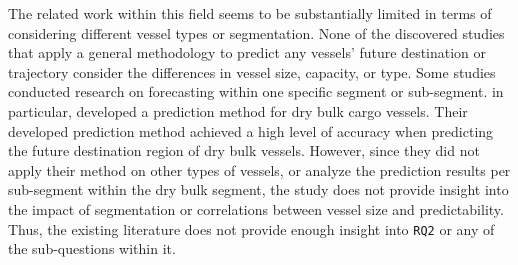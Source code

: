 The related work within this field seems to be substantially limited in terms of considering different vessel types or segmentation. None of the discovered studies that apply a general methodology to predict any vessels' future destination or trajectory consider the differences in vessel size, capacity, or type. Some studies conducted research on forecasting within one specific segment or sub-segment. \cite{lechtenberg2019} in particular, developed a prediction method for dry bulk cargo vessels. Their developed prediction method achieved a high level of accuracy when predicting the future destination region of dry bulk vessels. However, since they did not apply their method on other types of vessels, or analyze the prediction results per sub-segment within the dry bulk segment, the study does not provide insight into the impact of segmentation or correlations between vessel size and predictability. Thus, the existing literature does not provide enough insight into \texttt{RQ2} or any of the sub-questions within it.



